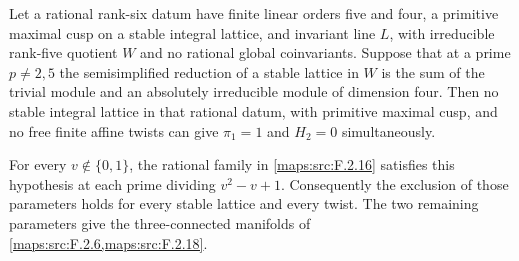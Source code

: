 \begin{theorem}\hypertarget{tag-02N8}{}\label{maps:src:F.2.19}


Let a rational rank-six datum have finite linear orders five
and four, a primitive maximal cusp on a stable integral lattice,
and invariant line $L$, with irreducible rank-five quotient $W$
and no rational global coinvariants.  Suppose that at a prime
$p\ne2,5$ the semisimplified reduction of a stable lattice in
$W$ is the sum of the trivial module and an absolutely
irreducible module of dimension four.  Then no stable integral
lattice in that rational datum, with primitive maximal cusp,
and no free finite affine twists can give
$\pi_1=1$ and $H_2=0$ simultaneously.

For every $v\notin\{0,1\}$, the rational family in \ref{maps:src:F.2.16}
satisfies this hypothesis at each prime dividing
$v^2-v+1$.  Consequently the exclusion of those parameters
holds for every stable lattice and every twist.  The two remaining parameters give the three-connected manifolds of \cref{maps:src:F.2.6,maps:src:F.2.18}.

\end{theorem}


